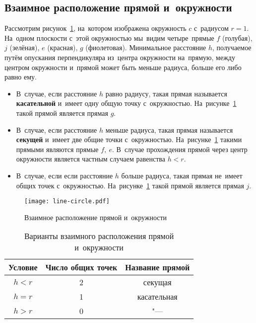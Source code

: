 \documentclass[]{scrartcl}
\begin{document}
\subsection{Взаимное расположение прямой и~окружности}
Рассмотрим рисунок~\ref{fig:line-circle}, на~котором изображена окружность ${\textstyle c}$ с~радиусом ${\textstyle r=1}$. На~одном плоскости с~этой окружностью мы~видим четыре~прямые ${\textstyle f}$ (голубая), ${\textstyle j}$ (зелёная), ${\textstyle e}$ (красная), ${\textstyle g}$ (фиолетовая). Минимальное расстояние ${\textstyle h}$, получаемое путём опускания перпендикуляра из~центра окружности на~прямую, между центром окружности и~прямой может быть меньше радиуса, больше его либо равно ему. 
\begin{itemize}
	\item В~случае, если расстояние ${\textstyle h}$ равно радиусу, такая прямая называется \textbf{касательной} и~имеет одну общую точку с~окружностью. На~рисунке~\ref{fig:line-circle} такой прямой является прямая ${\textstyle g}$.
	\item В~случае, если расстояние ${\textstyle h}$ меньше радиуса, такая прямая называется \textbf{секущей} и~имеет две общие точки с~окружностью. На~рисунке~\ref{fig:line-circle} такими прямыми являются прямые ${\textstyle f,\ e}$. В~случае прохождения прямой через центр окружности является частным случаем равенства ${\textstyle h < r}$.
	\item В~случае, если если расстояние ${\textstyle h}$ больше радиуса, такая прямая не~имеет общих точек с~окружностью. На~рисунке~\ref{fig:line-circle} такой прямой является прямая ${\textstyle j}$.
\end{itemize}

\begin{figure}[ht]
	\centering %
	\texttt{[image: line-circle.pdf]}
	\caption{Взаимное расположение прямой и~окружности}\label{fig:line-circle}
\end{figure}

\begin{table}[ht]
	\caption{Варианты взаимного расположения прямой и~окружности}  \label{tab:line-circ}
	\centering%
	\begin{tabularx}{\textwidth}{ccc} 
		\hline
	Условие&Число общих точек&Название прямой\\ \hline
	${\textstyle h<r}$&2&секущая\\ \hline
	${\textstyle h=r}$&1&касательная\\ \hline
	${\textstyle h>r}$&0&"---\\ \hline
	\end{tabularx}
	\end{table}
\end{document}
